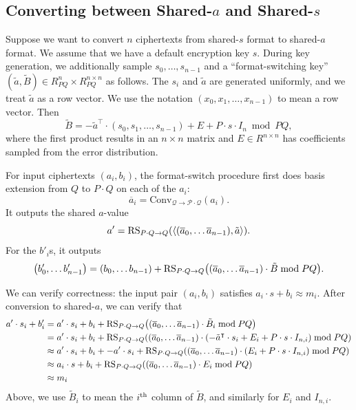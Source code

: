 \documentclass[../fheimpl.tex]{subfiles}
\begin{document}
\subsection{Converting between Shared-$a$ and Shared-$s$}
Suppose we want to convert $n$ ciphertexts from shared-$s$ format to shared-$a$ format.
We assume that we have a default encryption key $s$. During key generation, we additionally sample $s_0, \ldots, s_{n-1}$ and a ``format-switching key'' $(\tilde{a}, \tilde{B})\in R^n_{PQ}\times R^{n\times n}_{PQ}$ as follows. The $s_i$ and $\tilde{a}$ are generated uniformly, and we treat $\tilde{a}$ as a row vector. We use the notation $(x_0, x_1, \ldots, x_{n-1})$ to mean a row vector. Then 
\[\tilde{B} = -\tilde{a}^\intercal\cdot	(s_0, s_1, \ldots,  s_{n-1})+E+P\cdot s\cdot I_n\bmod PQ,\]
where the first product results in an $n\times n$ matrix and $E\in R^{n\times n}$ has coefficients sampled from the error distribution.

For input ciphertexts $(a_i, b_i)$, the format-switch procedure first does basis extension from $Q$ to $P\cdot Q$ on each of the $a_i$:
\[\overline{a}_i = \mathrm{Conv}_{\mathcal{Q}\rightarrow\mathcal{P\cdot Q}}(a_i).\]
It outputs the shared $a$-value
\[a' = \mathrm{RS}_{P\cdot Q\rightarrow Q}\parens*{\inner{\parens*{\overline{a}_0, \ldots \overline{a}_{n-1}},\tilde{a}}}.\]
For the $b'_i$s, it outputs
\[\parens*{b'_0, \ldots b'_{n-1}} = \parens*{b_0, \ldots b_{n-1}} + \mathrm{RS}_{P\cdot Q\rightarrow Q}\parens*{\parens*{\overline{a}_0, \ldots \overline{a}_{n-1}}\cdot \tilde{B}\bmod PQ}.\]

We can verify correctness: the input pair $(a_i, b_i)$ satisfies $a_i\cdot s + b_i\approx m_i$. After conversion to shared-$a$, we can verify that
\begin{align}
	a'\cdot s_i + b'_i &= a'\cdot s_i + b_i + \mathrm{RS}_{P\cdot Q\rightarrow Q}\parens*{\parens{\overline{a}_0, \ldots \overline{a}_{n-1}}\cdot \tilde{B}_i\bmod PQ} \\
	&= a'\cdot s_i + b_i + \mathrm{RS}_{P\cdot Q\rightarrow Q}\parens*{\parens*{\overline{a}_0, \ldots \overline{a}_{n-1}}\cdot (-\tilde{a}^\intercal\cdot	s_i+E_i+P\cdot s\cdot I_{n,i})\bmod PQ} \\
	&\approx a'\cdot s_i + b_i + -a'\cdot s_i + \mathrm{RS}_{P\cdot Q\rightarrow Q}\parens*{\parens*{\overline{a}_0, \ldots \overline{a}_{n-1}}\cdot (E_i+P\cdot s\cdot I_{n,i})\bmod PQ} \\
	&\approx a_i\cdot s + b_i + \mathrm{RS}_{P\cdot Q\rightarrow Q}\parens*{\parens*{\overline{a}_0, \ldots \overline{a}_{n-1}}\cdot E_i\bmod PQ} \\
	&\approx m_i
\end{align}
Above, we use $\tilde{B}_i$ to mean the $i^{\mathrm{th}}$ column of $\tilde{B}$, and similarly for $E_i$ and $I_{n,i}$.
\end{document}
